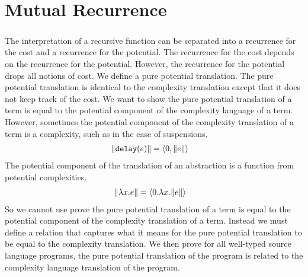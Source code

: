 \chapter{Mutual Recurrence}

\paragraph{}
The interpretation of a recursive function can be separated into a recurrence
for the cost and a recurrence for the potential. The recurrence for the cost
depends on the recurrence for the potential. However, the recurrence for the
potential drops all notions of cost. We define a pure potential translation.
The pure potential translation is identical to the complexity translation
except that it does not keep track of the cost. We want to show the pure
potential translation of a term is equal to the potential component of the
complexity language of a term. However, sometimes the potential component of
the complexity translation of a term is a complexity, such as in the case of
suspensions.
%
\begin{align*}
  \|\texttt{delay}(e)\| &= \langle 0,\|e\|\rangle
\end{align*}
%
The potential component of the translation of an abstraction is a function from
potential complexities.
%
\begin{align*}
  \|\lambda x.e\| &= \langle 0.\lambda x.\|e\|\rangle
\end{align*}
%
So we cannot use prove the pure potential translation of a term is equal to the
potential component of the complexity translation of a term. Instead we must
define a relation that captures what it means for the pure potential
translation to be equal to the complexity translation. We then prove for all
well-typed source language programs, the pure potential translation of the
program is related to the complexity language translation of the program.



